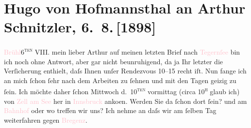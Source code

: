 

               \section[Hugo von Hofmannsthal an Arthur Schnitzler, 6. 8. {[}1898{]}]{ Hugo von Hofmannsthal an Arthur Schnitzler, 6. 8. {[}1898{]}}\nopagebreak{}\rehead{ }\normalsize\beginnumbering{} \toendnotes[C]{\smallbreak\pagebreak[2]} 
\toendnotes[C]{\smallbreak}\pstart
           \raggedleft{}{\pb}\textcolor{pink}{Brühl}{}\ledrightnote{\textcolor{pink}{Hinterbrühl}}{ }6\textsc{\textsuperscript{ten}} VIII.\pend
           \pstart{}mein lieber Arthur\pend\pstart
           auf meinen letzten Brief \introOben{}nach \textcolor{pink}{Tegernſee}{}\ledrightnote{\textcolor{pink}{Tegernsee}}\introOben{} bin ich noch ohne Antwort, aber gar nicht beunruhigend, da ja Ihr letzter
                    die Verſicherung enthielt, daſs Ihnen unſer Rendezvous
                        10–15 recht iſt. Nun fange ich an mich ſchon ſehr
                    nach dem Arbeiten zu ſehnen und mit den Tagen geizig zu ſein.\pend
           \pstart
           {\pb}Ich möchte daher ſchon
                        Mittwoch d. 10\textsc{\textsuperscript{ten}} vormittag (circa 10\textsc{\textsuperscript{h}} glaub ich) von \textcolor{pink}{Zell am See}{}\ledrightnote{\textcolor{pink}{Zell am See}} her in \textcolor{pink}{Innsbruck}{}\ledrightnote{\textcolor{pink}{Innsbruck}} anko{\geminationm}en.
                    Werden Sie da ſchon dort ſein? und am \textcolor{pink}{Bahnhof}{} oder wo treffen wir uns? Ich nehme an daſs
                    wir am ſelben Tag weiterfahren gegen \textcolor{pink}{Bregenz}{}\ledrightnote{\textcolor{pink}{Bregenz}}.
